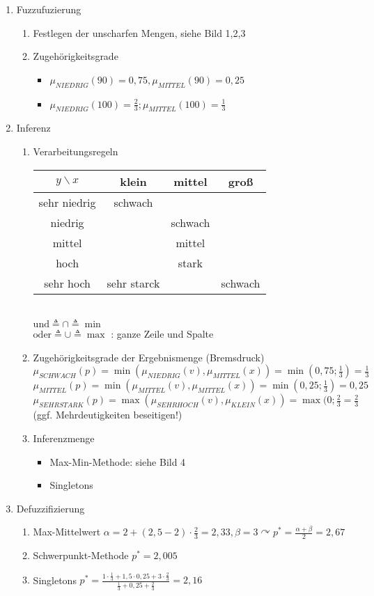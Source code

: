 \documentclass[a4paper]{scrartcl}
\begin{document}
\begin{enumerate}
\item Fuzzufuzierung
	\begin{enumerate}
	\item Festlegen der unscharfen Mengen, siehe Bild 1,2,3
	\item Zugehörigkeitsgrade
		\begin{itemize}
		\item $\mu_{NIEDRIG} (90) = 0,75, \mu_{MITTEL} (90) = 0,25$
		\item $\mu_{NIEDRIG} (100) = \frac{2}{3} ; \mu_{MITTEL} (100) = \frac{1}{3}$
		\end{itemize}
	\end{enumerate}
\item Inferenz
	\begin{enumerate}
	\item Verarbeitungsregeln\\
	\begin{tabular}{c|c|c|c}
	$y \backslash x$ & klein & mittel & groß \\ \hline
	sehr niedrig & schwach & &  \\
	niedrig & & schwach & \\
	mittel & & mittel & \\
	hoch & & stark & \\
	sehr hoch & sehr starck & & schwach\\
	\end{tabular}\\
	$\text{und} \triangleq \cap \triangleq \min$\\
	$\text{oder} \triangleq \cup \triangleq \max$ : ganze Zeile und Spalte
	\item Zugehörigkeitsgrade der Ergebnismenge (Bremsdruck)\\
	$\mu_{SCHWACH} (p) = \min (\mu_{NIEDRIG}(v), \mu_{MITTEL} (x) ) = \min (0,75;\frac{1}{3}) = \frac{1}{3}$\\
	$\mu_{MITTEL} (p) = \min (\mu_{MITTEL}(v),\mu_{MITTEL}(x)) = \min (0,25;\frac{1}{3} ) = 0,25$\\
	$\mu_{SEHRSTARK} (p) = \max (\mu_{SEHRHOCH} (v), \mu_{KLEIN}(x) ) = \max (0;\frac{2}{3} = \frac{2}{3}$\\
	(ggf. Mehrdeutigkeiten beseitigen!)
	\item Inferenzmenge
		\begin{itemize}
		\item Max-Min-Methode: siehe Bild 4
		\item Singletons
		\end{itemize}
	\end{enumerate}
\item Defuzzifizierung
	\begin{enumerate}
	\item Max-Mittelwert $\alpha = 2 + (2,5 -2 ) \cdot \frac{2}{3} = 2,33, \beta = 3 \curvearrowright p^* = \frac{\alpha + \beta}{2} = 2,67$
	\item Schwerpunkt-Methode $p^* = 2,005$
	\item Singletons $p^* = \frac{1 \cdot \frac{1}{3} + 1,5 \cdot 0,25 + 3 \cdot \frac{2}{3} }{\frac{1}{3} + 0,25 + \frac{2}{3}} = 2,16$
	\end{enumerate}
\end{enumerate}
\end{document}
